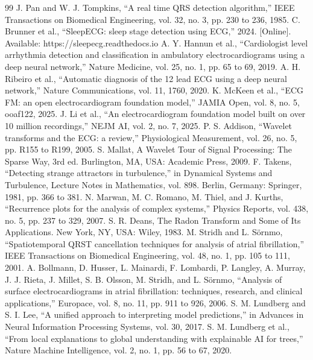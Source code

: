 \documentclass[conference,a4paper]{IEEEtran}
\begin{document}
\begin{thebibliography}{99}
 J. Pan and W. J. Tompkins, ``A real time QRS detection algorithm,'' IEEE Transactions on Biomedical Engineering, vol. 32, no. 3, pp. 230 to 236, 1985.
 C. Brunner et al., ``SleepECG: sleep stage detection using ECG,'' 2024. [Online]. Available: https://sleepecg.readthedocs.io
 A. Y. Hannun et al., ``Cardiologist level arrhythmia detection and classification in ambulatory electrocardiograms using a deep neural network,'' Nature Medicine, vol. 25, no. 1, pp. 65 to 69, 2019.
 A. H. Ribeiro et al., ``Automatic diagnosis of the 12 lead ECG using a deep neural network,'' Nature Communications, vol. 11, 1760, 2020.
 K. McKeen et al., ``ECG FM: an open electrocardiogram foundation model,'' JAMIA Open, vol. 8, no. 5, ooaf122, 2025.
 J. Li et al., ``An electrocardiogram foundation model built on over 10 million recordings,'' NEJM AI, vol. 2, no. 7, 2025.
 P. S. Addison, ``Wavelet transforms and the ECG: a review,'' Physiological Measurement, vol. 26, no. 5, pp. R155 to R199, 2005.
 S. Mallat, A Wavelet Tour of Signal Processing: The Sparse Way, 3rd ed. Burlington, MA, USA: Academic Press, 2009.
 F. Takens, ``Detecting strange attractors in turbulence,'' in Dynamical Systems and Turbulence, Lecture Notes in Mathematics, vol. 898. Berlin, Germany: Springer, 1981, pp. 366 to 381.
 N. Marwan, M. C. Romano, M. Thiel, and J. Kurths, ``Recurrence plots for the analysis of complex systems,'' Physics Reports, vol. 438, no. 5, pp. 237 to 329, 2007.
 S. R. Deans, The Radon Transform and Some of Its Applications. New York, NY, USA: Wiley, 1983.
 M. Stridh and L. Sörnmo, ``Spatiotemporal QRST cancellation techniques for analysis of atrial fibrillation,'' IEEE Transactions on Biomedical Engineering, vol. 48, no. 1, pp. 105 to 111, 2001.
 A. Bollmann, D. Husser, L. Mainardi, F. Lombardi, P. Langley, A. Murray, J. J. Rieta, J. Millet, S. B. Olsson, M. Stridh, and L. Sörnmo, ``Analysis of surface electrocardiograms in atrial fibrillation: techniques, research, and clinical applications,'' Europace, vol. 8, no. 11, pp. 911 to 926, 2006.
 S. M. Lundberg and S. I. Lee, ``A unified approach to interpreting model predictions,'' in Advances in Neural Information Processing Systems, vol. 30, 2017.
 S. M. Lundberg et al., ``From local explanations to global understanding with explainable AI for trees,'' Nature Machine Intelligence, vol. 2, no. 1, pp. 56 to 67, 2020.

\end{thebibliography}
\end{document}
